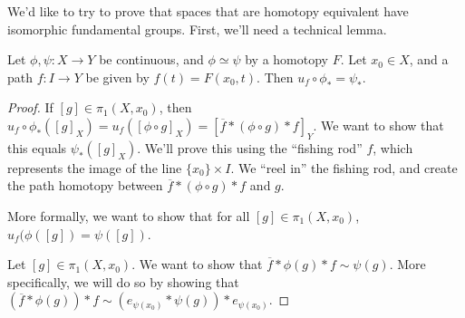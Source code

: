 We'd like to try to prove that spaces that are homotopy equivalent have isomorphic fundamental groups. First, we'll need a technical lemma.
\begin{lemma}
Let $\phi, \psi : X \to Y$ be continuous, and $\phi\simeq \psi$ by a homotopy $F$. Let $x_0 \in X$, and  a path $f:I \to Y$ be given by $f(t) = F(x_0,t)$. 
Then $u_f \circ \phi_\ast = \psi_\ast$. 
\end{lemma}
\begin{proof}
If $[g]\in \pi_1 (X,x_0)$, then $u_f \circ \phi_\ast \left( [g]_X\right) = u_f ( [\phi \circ g]_X) = [\overline{f} \ast (\phi \circ g) \ast f ]_Y$. We want to show that this equals $\psi_\ast ([g]_X)$. We'll prove this using the ``fishing rod'' $f$, which represents the image of the line $\{x_0\} \times I$. We ``reel in'' the fishing rod, and create the path homotopy between $\overline{f} \ast (\phi \circ g) \ast f$ and $g$. 

More formally, we want to show that for all $[g]\in\pi_1(X,x_0)$, $u_f(\phi([g])=\psi([g])$.

Let $[g]\in\pi_1(X,x_0)$. We want to show that $\overline{f}*\phi(g)*f\sim \psi(g)$. More specifically, we will do so by showing that $\left(\overline{f}*\phi(g)\right)*f\sim \left( e_{\psi(x_0)}*\psi(g)\right)*e_{\psi(x_0)}$.


\end{proof}
